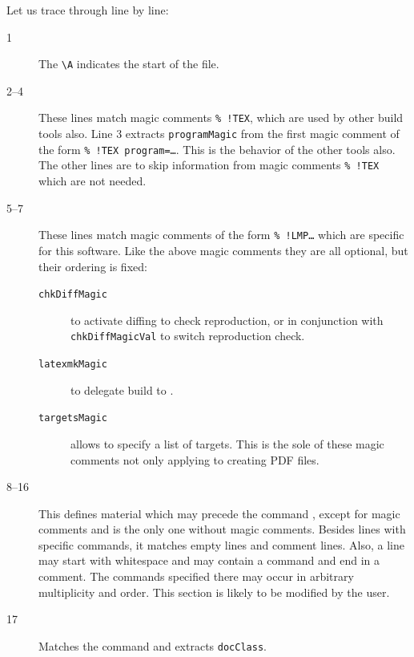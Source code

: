 Let us trace through line by line: 
%
\begin{description}
  \item[1]
  The \texttt{\textbackslash A} indicates the start of the file. 
  \item[2--4]
  These lines match magic comments \texttt{\%~!TEX}, 
  which are used by other build tools also. 
  Line 3 extracts \texttt{programMagic} 
  from the first magic comment of the form \texttt{\%~!TEX program=\dots}. 
  This is the behavior of the other tools also. 
  The other lines are to skip information from magic comments \texttt{\%~!TEX} 
  which are not needed. 
  \item[5--7]
  These lines match magic comments of the form \texttt{\%~!LMP\dots} 
  which are specific for this software. 
  Like the above magic comments they are all optional, 
  but their ordering is fixed: 
 \begin{description}
  \item[\texttt{chkDiffMagic}]
  to activate diffing to check reproduction,
  or in conjunction with \texttt{chkDiffMagicVal} to switch reproduction check.
  \item[\texttt{latexmkMagic}]
  to delegate build to .
  \item[\texttt{targetsMagic}] 
  allows to specify a list of targets.
  This is the sole of these magic comments not only applying to creating PDF files.
\end{description}
  \item[8--16]
  This defines material which may precede the command , 
  except for magic comments and is the only one without magic comments. 
  Besides lines with specific commands, it matches empty lines and comment lines. 
  Also, a line may start with whitespace 
  and may contain a command and end in a comment. 
  The commands specified there may occur in arbitrary multiplicity and order. 
  This section is likely to be modified by the user. 
  \item[17]
  Matches the command  and extracts \texttt{docClass}. 
\end{description}



